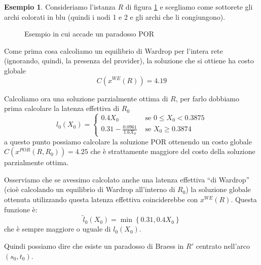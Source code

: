 \documentclass[a4paper]{article}
\theoremstyle{plain}
\theoremstyle{definition}
\newtheorem{myes}[myteo]{Esempio}
\theoremstyle{remark}
\newcommand{\set}[1]{\left\{#1\right\}}
\newcommand{\pa}[1]{\left(#1\right)}
\begin{document}
\begin{myes}
  Consideriamo l'istanza $R$ di figura \ref{fig:paradosso-por} e
  scegliamo come sottorete gli archi colorati in blu (quindi i nodi 1
  e 2 e gli archi che li congiungono).

  \begin{figure}[ht]
    \centering
    \caption{Esempio in cui accade un paradosso POR}
    \label{fig:paradosso-por}
  \end{figure}

  Come prima cosa calcoliamo un equilibrio di Wardrop per l'intera
  rete (ignorando, quindi, la presenza del provider), la soluzione che
  si ottiene ha costo globale
  \[ C\pa{x^{WE}\pa{R}} = 4.19 \]
  
  Calcoliamo ora una soluzione parzialmente ottima di $R$, per farlo
  dobbiamo prima calcolare la latenza effettiva di $R_0$
  \[ l_0\pa{X_0} = \left\{
      \begin{matrix}
        0.4 X_0 & \text{ se } 0 \le X_0 < 0.3875 \\
        0.31 - \frac{0.0961}{1.6X_0} & \text{ se } X_0 \ge 0.3874
      \end{matrix} \right.
  \]
  a questo punto possiamo calcolare la soluzione POR ottenendo un
  costo globale $C\pa{x^{POR}\pa{R,R_0}} = 4.25$ che è strattamente
  maggiore del costo della soluzione parzialmente ottima.

  Osserviamo che se avessimo calcolato anche una latenza effettiva
  ``di Wardrop'' (cioè calcolando un equilibrio di Wardrop all'interno
  di $R_0$) la soluzione globale ottenuta utilizzando questa latenza
  effettiva coinciderebbe con $x^{WE}\pa{R}$. Questa funzione è:
  \[ \tilde l _0 \pa{X_0} = \min\set{0.31, 0.4X_0} \]
  che è sempre maggiore o uguale di $l_0\pa{X_0}$.

  Quindi possiamo dire che esiste un paradosso di Braess in $R'$
  centrato nell'arco $\pa{s_0,t_0}$.
\end{myes}
\end{document}
